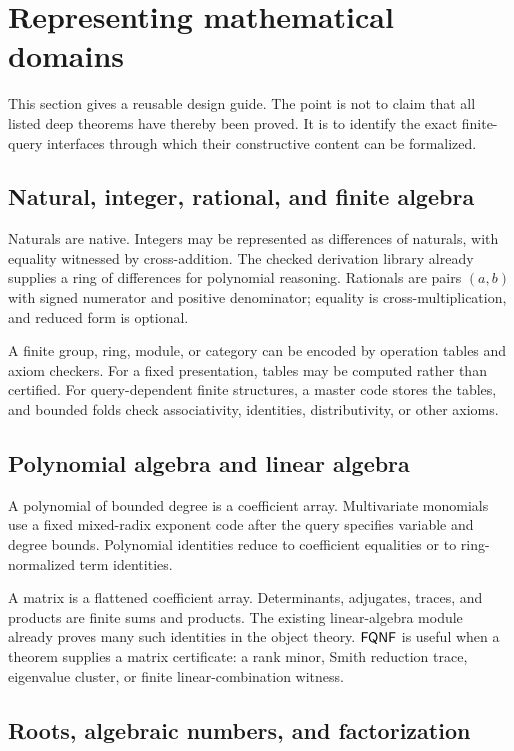 \section{Representing mathematical domains}

This section gives a reusable design guide.  The point is not to claim that all
listed deep theorems have thereby been proved.  It is to identify the exact
finite-query interfaces through which their constructive content can be
formalized.

\subsection{Natural, integer, rational, and finite algebra}

Naturals are native.  Integers may be represented as differences of naturals,
with equality witnessed by cross-addition.  The checked derivation library
already supplies a ring of differences for polynomial reasoning.  Rationals
are pairs \((a,b)\) with signed numerator and positive denominator; equality is
cross-multiplication, and reduced form is optional.

A finite group, ring, module, or category can be encoded by operation tables and
axiom checkers.  For a fixed presentation, tables may be computed rather than
certified.  For query-dependent finite structures, a master code stores the
tables, and bounded folds check associativity, identities, distributivity, or
other axioms.

\subsection{Polynomial algebra and linear algebra}

A polynomial of bounded degree is a coefficient array.  Multivariate monomials
use a fixed mixed-radix exponent code after the query specifies variable and
degree bounds.  Polynomial identities reduce to coefficient equalities or to
ring-normalized term identities.

A matrix is a flattened coefficient array.  Determinants, adjugates, traces,
and products are finite sums and products.  The existing linear-algebra module
already proves many such identities in the object theory.  \(\mathsf{FQNF}\) is useful
when a theorem supplies a matrix certificate: a rank minor, Smith reduction
trace, eigenvalue cluster, or finite linear-combination witness.

\subsection{Roots, algebraic numbers, and factorization}

